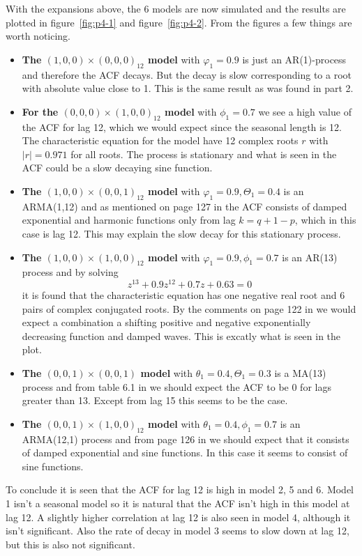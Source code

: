 With the expansions above, the 6 models are now simulated and the results are plotted in figure~\ref{fig:p4-1} and figure~\ref{fig:p4-2}. From the figures a few things are worth noticing. 
\begin{itemize}
    \item \textbf{The $(1,0,0)\times(0,0,0)_{12}$ model} with $\varphi_1=0.9$ is just an AR(1)-process and therefore the ACF decays. But the decay is slow corresponding to a root with absolute value close to 1. This is the same result as was found in part 2.
    \item \textbf{For the $(0,0,0)\times(1,0,0)_{12}$ model} with $\phi_1=0.7$ we see a high value of the ACF for lag 12, which we would expect since the seasonal length is 12. The characteristic equation for the model have 12 complex roots $r$ with $|r|=0.971$ for all roots. The process is stationary and what is seen in the ACF could be a slow decaying sine function.
    \item \textbf{The $(1,0,0)\times(0,0,1)_{12}$ model} with $\varphi_1=0.9, \Theta_1=0.4$ is an ARMA(1,12) and as mentioned on page 127 in \cite{hm} the ACF consists of damped exponential and harmonic functions only from lag $k=q+1-p$, which in this case is lag 12. This may explain the slow decay for this stationary process. 
    \item \textbf{The $(1,0,0)\times(1,0,0)_{12}$ model} with $\varphi_1=0.9, \phi_1=0.7$ is an AR(13) process and by solving
        \begin{equation*}
            z^{13} + 0.9z^{12} + 0.7z + 0.63 = 0
        \end{equation*}
        it is found that the characteristic equation has one negative real root and 6 pairs of complex conjugated roots. By the comments on page 122 in \cite{hm} we would expect a combination a shifting positive and negative exponentially decreasing function and damped waves. This is excatly what is seen in the plot.
    \item \textbf{The $(0,0,1)\times(0,0,1)$ model} with $\theta_1=0.4, \Theta_1=0.3$ is a MA(13) process and from table 6.1 in \cite{hm} we should expect the ACF to be 0 for lags greater than 13. Except from lag 15 this seems to be the case.
    \item \textbf{The $(0,0,1)\times(1,0,0)_{12}$ model} with $\theta_1=0.4, \phi_1=0.7$ is an ARMA(12,1) process and from page 126 in \cite{hm} we should expect that it consists of damped exponential and sine functions. In this case it seems to consist of sine functions.
\end{itemize}
To conclude it is seen that the ACF for lag 12 is high in model 2, 5 and 6. Model 1 isn't a seasonal model so it is natural that the ACF isn't high in this model at lag 12. A slightly higher correlation at lag 12 is also seen in model 4, although it isn't significant. Also the rate of decay in model 3 seems to slow down at lag 12, but this is also not significant.

